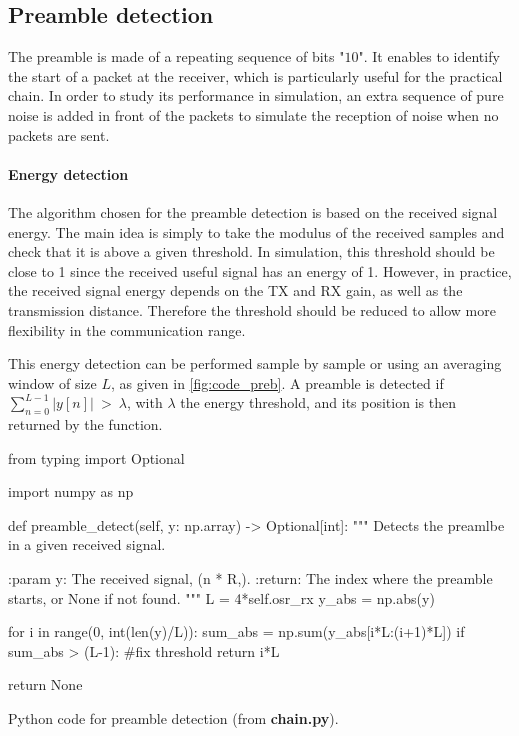 \subsection{Preamble detection}
The preamble is made of a repeating sequence of bits "$10$". It enables to identify the start of a packet at the receiver, which is particularly useful for the practical chain. In order to study its performance in simulation, an extra sequence of pure noise is added in front of the packets to simulate the reception of noise when no packets are sent.

\paragraph{Energy detection} The algorithm chosen for the preamble detection is based on the received signal energy. The main idea is simply to take the modulus of the received samples and check that it is above a given threshold. In simulation, this threshold should be close to 1 since the received useful signal has an energy of 1. However, in practice, the received signal energy depends on the TX and RX gain, as well as the transmission distance. Therefore the threshold should be reduced to allow more flexibility in the communication range.

This energy detection can be performed sample by sample or using an averaging window of size $L$, as given in \autoref{fig:code_preb}. A preamble is detected if $\sum_{n=0}^{L-1}|y[n]| \: > \: \lambda$,
with $\lambda$ the energy threshold, and its position is then returned by the function.

\begin{listing}[H]
\begin{python}
from typing import Optional

import numpy as np

def preamble_detect(self, y: np.array) -> Optional[int]:
    """
    Detects the preamlbe in a given received signal.
  
    :param y: The received signal, (n * R,).
    :return: The index where the preamble starts,
        or None if not found.
    """
    L = 4*self.osr_rx
    y_abs = np.abs(y)

    for i in range(0, int(len(y)/L)):
        sum_abs = np.sum(y_abs[i*L:(i+1)*L])
        if sum_abs > (L-1): #fix threshold
            return i*L

    return None

\end{python}
\caption{Python code for preamble detection (from \textbf{chain.py}).}
\label{fig:code_preb}
\end{listing}

